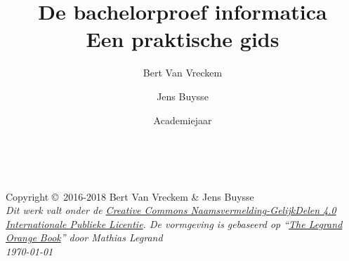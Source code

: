\documentclass[11pt,fleqn,a4paper]{book}
\author{Bert {Van Vreckem} \and Jens Buysse}
\title{De bachelorproef informatica\\Een praktische gids}
\date{Academiejaar \acadj}
\begin{document}
\thetitlepage


\newpage
~\vfill
\thispagestyle{empty}

\noindent Copyright \copyright\ 2016-2018 Bert Van Vreckem \& Jens Buysse\\ %

\noindent \textit{Dit werk valt onder de \href{http://creativecommons.org/licenses/by-sa/4.0/}{Creative Commons Naamsvermelding-GelijkDelen 4.0 Internationale Publieke Licentie}. De vormgeving is gebaseerd op ``\href{http://www.latextemplates.com/template/the-legrand-orange-book}{The Legrand Orange Book}'' door Mathias Legrand}\\

\noindent \textit{\today} %

\usechapterimagefalse

\tableofcontents %

\cleardoublepage %










\printbibliography[notkeyword=voorbeeld]
\end{document}
